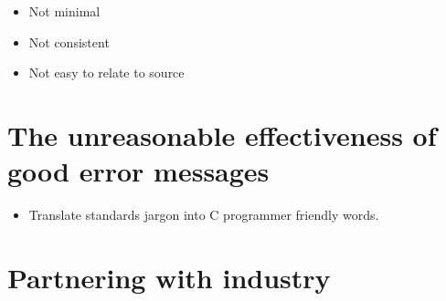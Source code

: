 \begin{itemize}
    \item Not minimal
    \item Not consistent
    \item Not easy to relate to source
\end{itemize}

\section{The unreasonable effectiveness of good error messages}\label{sec:error-msgs}

\begin{itemize}
    \item Translate standards jargon into C programmer friendly words.
\end{itemize}

\section{Partnering with industry}

